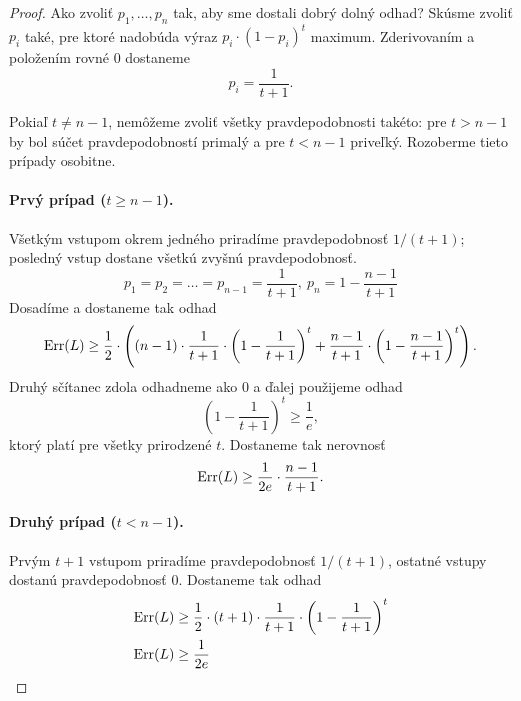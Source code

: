\begin{proof}
  Ako zvoliť $p_1, \ldots, p_n$ tak, aby sme dostali dobrý dolný
  odhad? Skúsme zvoliť $p_i$ také, pre ktoré nadobúda výraz
  $p_i \cdot (1 - p_i)^t$ maximum. Zderivovaním a položením
  rovné $0$ dostaneme
  $$p_i = \frac{1}{t+1}.$$
  
  Pokiaľ $t \neq n - 1$, nemôžeme zvoliť všetky pravdepodobnosti
  takéto: pre $t > n - 1$ by bol súčet pravdepodobností primalý
  a pre $t < n - 1$ priveľký. Rozoberme tieto prípady osobitne.
  
  \paragraph{Prvý prípad ($t \geq n - 1$).} Všetkým vstupom okrem jedného
  priradíme pravdepodobnosť $1/(t+1)$; posledný vstup dostane všetkú zvyšnú
  pravdepodobnosť.
  $$ p_1 = p_2 = \ldots = p_{n-1} = \frac{1}{t+1},\ p_n = 1 - \frac{n-1}{t+1}$$
  Dosadíme a dostaneme tak odhad
  $$ \mathrm{Err}(L) \geq \frac{1}{2} \cdot \left( (n - 1) \cdot \frac{1}{t+1} \cdot \left( 1 - \frac{1}{t+1} \right)^t + \frac{n-1}{t+1} \cdot \left( 1 - \frac{n-1}{t+1} \right)^t \right). $$
  Druhý sčítanec zdola odhadneme ako $0$ a ďalej použijeme odhad
  $$ \left( 1 - \frac{1}{t+1} \right)^t \geq \frac{1}{e}, $$
  ktorý platí pre všetky prirodzené $t$. Dostaneme tak nerovnosť
  $$ \mathrm{Err}(L) \geq \frac{1}{2e} \cdot \frac{n-1}{t+1}. $$
  
  \paragraph{Druhý prípad ($t < n - 1$).} Prvým $t+1$ vstupom priradíme
  pravdepodobnosť $1/(t+1)$, ostatné vstupy dostanú pravdepodobnosť $0$.
  Dostaneme tak odhad
  \begin{align}
    \mathrm{Err}(L) &\geq \frac{1}{2} \cdot (t + 1) \cdot \frac{1}{t+1} \cdot \left( 1 - \frac{1}{t+1} \right)^t \\
    \mathrm{Err}(L) &\geq \frac{1}{2e}
  \end{align}
  
  
\end{proof}

